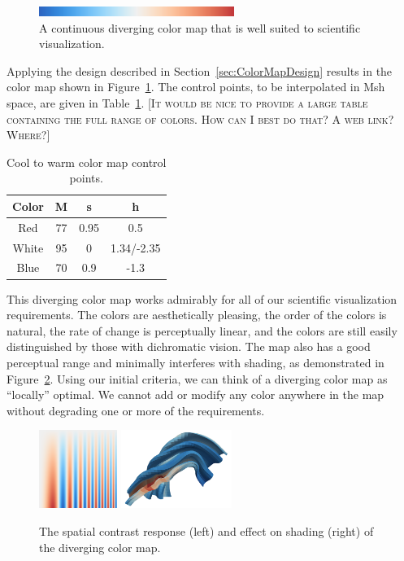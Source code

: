 \documentclass{vgtc}                          %
\newcommand{\sticky}[1]{\textsc{[#1]}}
\newcommand{\Msh}{Msh\xspace}
\begin{document}
\begin{figure}
  \centering
  \includegraphics[width=2.5in]{images/Cool2WarmBar}
  \caption{A continuous diverging color map that is well suited to scientific
    visualization.}
  \label{fig:Cool2WarmBar}
\end{figure}

Applying the design described in Section~\ref{sec:ColorMapDesign} results
in the color map shown in Figure~\ref{fig:Cool2WarmBar}.  The control
points, to be interpolated in \Msh space, are given in
Table~\ref{table:Cool2Warm}.  \sticky{It would be nice to provide a large
  table containing the full range of colors.  How can I best do that?  A
  web link?  Where?}

\begin{table}
  \centering
  \caption{Cool to warm color map control points.}
  \begin{tabular}{c@{\qquad}ccc}
    Color & M & s & h \\
    \hline
    Red & 77 & 0.95 & 0.5 \\
    White & 95 & 0 & 1.34/-2.35 \\
    Blue & 70 & 0.9 & -1.3
  \end{tabular}
  \label{table:Cool2Warm}
\end{table}

This diverging color map works admirably for all of our scientific
visualization requirements.  The colors are aesthetically pleasing, the
order of the colors is natural, the rate of change is perceptually linear,
and the colors are still easily distinguished by those with dichromatic
vision.  The map also has a good perceptual range and minimally interferes
with shading, as demonstrated in Figure~\ref{fig:Cool2WarmResponse}.
Using our initial criteria, we can think of a diverging color map as
``locally'' optimal.  We cannot add or modify any color anywhere in the map
without degrading one or more of the requirements.

\begin{figure}
  \centering
  \includegraphics[height=1in]{images/Cool2WarmSpatialContrast}
  \quad
  \includegraphics[height=1in]{images/Cool2WarmShading}
  \caption{The spatial contrast response (left) and effect on shading
    (right) of the diverging color map.}
  \label{fig:Cool2WarmResponse}
\end{figure}
\end{document}
